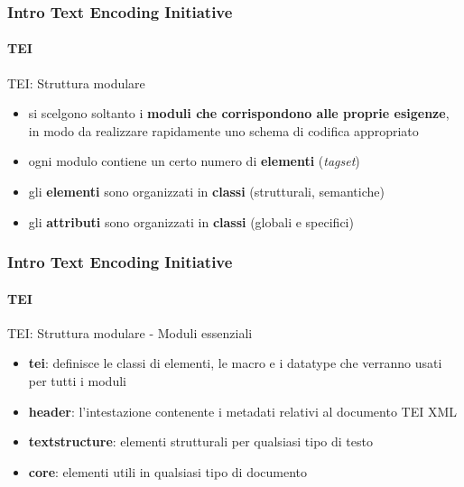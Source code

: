 

\begin{frame}
	\frametitle{Intro Text Encoding Initiative}
	\framesubtitle{TEI}
	\addtocounter{nframe}{1}

	\begin{block}{TEI: Struttura modulare}
		\begin{itemize}
			\item si scelgono soltanto i \textbf{moduli che corrispondono alle proprie esigenze}, in modo da realizzare rapidamente uno schema di codifica appropriato
			\item ogni modulo contiene un certo numero di \textbf{elementi} (\textit{tagset})
			\item gli \textbf{elementi} sono organizzati in \textbf{classi} (strutturali, semantiche)
			\item gli \textbf{attributi} sono organizzati in \textbf{classi} (globali e specifici)
		\end{itemize}

	\end{block}

\end{frame}




\begin{frame}
	\frametitle{Intro Text Encoding Initiative}
	\framesubtitle{TEI}
	\addtocounter{nframe}{1}

	\begin{block}{TEI: Struttura modulare - Moduli essenziali}
		\begin{itemize}
			\item \textbf{tei}: definisce le classi di elementi, le macro e i datatype che verranno usati per tutti i moduli
			\item \textbf{header}: l’intestazione contenente i metadati relativi al documento TEI XML
			\item \textbf{textstructure}: elementi strutturali per qualsiasi tipo di testo
			\item \textbf{core}: elementi utili in qualsiasi tipo di documento
		\end{itemize}

	\end{block}

\end{frame}

